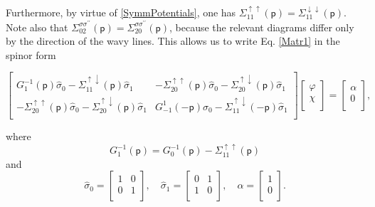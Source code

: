 \documentclass[reprint,superscriptaddress,showpacs,nofootinbib,aps,pra]{revtex4-1}
\begin{document}
Furthermore, by virtue of \eqref{SymmPotentials}, one has $\Sigma^{\uparrow \uparrow}_{11}(\mathsf p)=\Sigma^{\downarrow \downarrow}_{11}(\mathsf p)$. Note also that $\Sigma^{\sigma \sigma^{\prime\prime}}_{02}(\mathsf p)= \Sigma^{\sigma \sigma^{\prime\prime}}_{20}(\mathsf p)$, because the relevant diagrams differ only by the direction of the wavy lines. This allows us to write Eq. \eqref{Matr1} in the spinor form
\begin{widetext}
\begin{equation}\label{Matr2}
  \left[
    \begin{array}{cc}
      G_1^{-1}(\mathsf p) \hat\sigma_0 - \Sigma^{\uparrow \downarrow}_{11}(\mathsf p) \hat\sigma_1 & - \Sigma^{\uparrow \uparrow}_{20}(\mathsf p) \hat\sigma_0 - \Sigma^{\uparrow \downarrow}_{20}(\mathsf p) \hat\sigma_1 \\
      - \Sigma^{\uparrow \uparrow}_{20}(\mathsf p) \hat\sigma_0 - \Sigma^{\uparrow \downarrow}_{20}(\mathsf p) \hat\sigma_1 & G^1_{-1}(-\mathsf p) \hat\sigma_0 - \Sigma^{\uparrow \downarrow}_{11}(-\mathsf p) \hat\sigma_1 \\
    \end{array}
  \right] \left[
            \begin{array}{c}
              \varphi \\
              \chi \\
            \end{array}
          \right] = \left[
            \begin{array}{c}
              \alpha \\
              0 \\
            \end{array}
          \right],
\end{equation}
\end{widetext}
where
\begin{equation}\label{G11}
  G^{-1}_1(\mathsf p)=G^{-1}_0(\mathsf p) - \Sigma^{\uparrow \uparrow}_{11}(\mathsf p)
\end{equation}
and
\begin{equation}\label{Pauli1}
  \hat\sigma_0=\left[
             \begin{array}{cc}
               1 & 0 \\
               0 & 1 \\
             \end{array}
           \right], \quad \hat\sigma_1=\left[
             \begin{array}{cc}
               0 & 1 \\
               1 & 0 \\
             \end{array}
           \right],\quad\alpha=\left[
           \begin{array}{c}
           1\\
           0\\
           \end{array}
           \right].
\end{equation}
\end{document}
